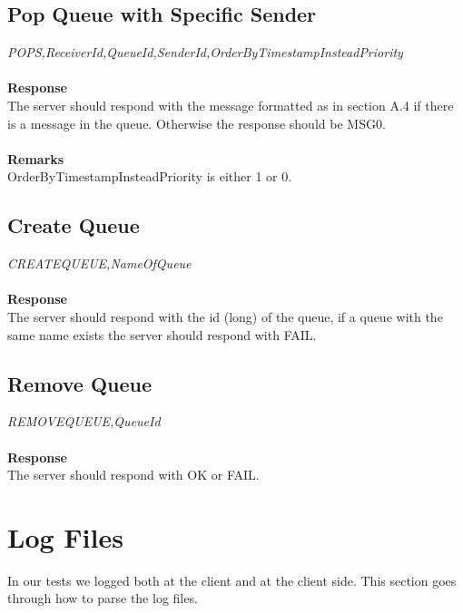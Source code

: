 \documentclass{article}
\begin{document}
            \subsection{Pop Queue with Specific Sender}
                \indent\indent\textit{POPS,ReceiverId,QueueId,SenderId,OrderByTimestampInsteadPriority}\\
                \\
                \textbf{Response}\\
                The server should respond with the message formatted as in section A.4 if there is a message in the queue. Otherwise the response should be MSG0.\\
                \\
                \textbf{Remarks}\\
                OrderByTimestampInsteadPriority is either 1 or 0.

            \subsection{Create Queue}
                \indent\indent\textit{CREATEQUEUE,NameOfQueue}\\
                \\
                \textbf{Response}\\
                The server should respond with the id (long) of the queue, if a queue with the same name exists the server should respond with FAIL.

            \subsection{Remove Queue}
                \indent\indent\textit{REMOVEQUEUE,QueueId}\\
                \\
                \textbf{Response}\\
                The server should respond with OK or FAIL.

        \section{Log Files}
        In our tests we logged both at the client and at the client side. This section goes through how to parse the log files.
\end{document}
